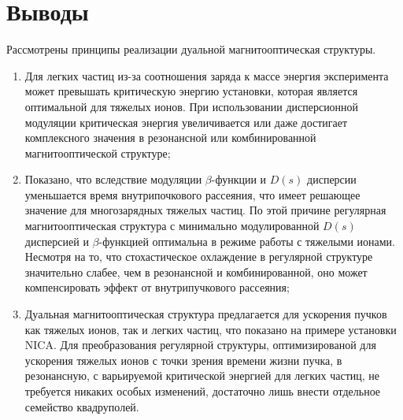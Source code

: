 \section*{Выводы}
\par Рассмотрены принципы реализации дуальной магнитооптическая структуры. 

\begin{enumerate}

\item  Для легких частиц из-за соотношения заряда к массе энергия эксперимента может превышать критическую энергию установки, которая является оптимальной для тяжелых ионов. При использовании дисперсионной модуляции критическая энергия увеличивается или даже достигает комплексного значения в резонансной или комбинированной магнитооптической структуре;

\item Показано, что вследствие модуляции $\beta$-функции и $D(s)$ дисперсии уменьшается время внутрипочкового рассеяния, что имеет решающее значение для многозарядных тяжелых частиц. По этой причине регулярная магнитооптическая структура с минимально модулированной $D(s)$ дисперсией и $\beta$-функцией оптимальна в режиме работы с тяжелыми ионами. Несмотря на то, что стохастическое охлаждение в регулярной структуре значительно слабее, чем в резонансной и комбинированной, оно может компенсировать эффект от внутрипучкового рассеяния;

\item Дуальная магнитооптическая структура предлагается для ускорения пучков как тяжелых ионов, так и легких частиц, что показано на примере установки NICA. Для преобразования регулярной структуры, оптимизированой для ускорения тяжелых ионов с точки зрения времени жизни пучка, в резонансную, с варьируемой критической энергией для легких частиц, не требуется никаких особых изменений, достаточно лишь внести отдельное семейство квадруполей.

\end{enumerate}

\FloatBarrier
